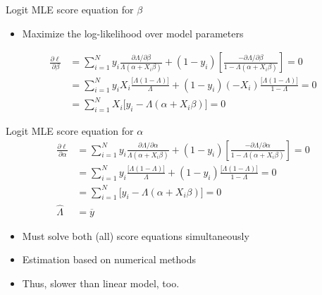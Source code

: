 \documentclass[
  ignorenonframetext,
]{beamer}
\providecommand{\tightlist}{%
  \setlength{\itemsep}{0pt}\setlength{\parskip}{0pt}}
\begin{document}
\begin{frame}{Logit MLE score equation for \(\beta\)}
\protect{}\label{logit-mle-score-equation-for-beta}
\begin{itemize}
\tightlist
\item
  Maximize the log-likelihood over model parameters
\end{itemize}

\[
\begin{split}
\frac{\partial \ell}{\partial \beta} &= \sum_{i=1}^N y_i \frac{\partial
  \Lambda / \partial \beta}{ \Lambda (\alpha + X_i\beta)} + (1-y_i) 
   \left[ \frac{- \partial  \Lambda / \partial \beta}{1-\Lambda(\alpha + X_i\beta)} \right] = 0 \\
&= \sum_{i=1}^N y_i X_i \frac{\big[\Lambda(1-\Lambda)\big]}{\Lambda} 
  + (1-y_i)(-X_i) \frac{\big[\Lambda(1-\Lambda)\big]}{1-\Lambda}  = 0 \\
&= \sum_{i=1}^N X_i \big[y_i - \Lambda(\alpha + X_i \beta) \big] = 0
\end{split}
\]
\end{frame}

\begin{frame}{Logit MLE score equation for \(\alpha\)}
\protect{}\label{logit-mle-score-equation-for-alpha}
\[
\begin{split}
\frac{\partial \ell}{\partial \alpha} &= \sum_{i=1}^N y_i \frac{\partial
  \Lambda / \partial \alpha}{ \Lambda (\alpha + X_i\beta)} + (1-y_i) 
   \left[ \frac{- \partial  \Lambda / \partial \alpha}{1-\Lambda(\alpha + X_i\beta)} \right] = 0 \\
&= \sum_{i=1}^N y_i \frac{\big[\Lambda(1-\Lambda)\big]}{\Lambda} 
  + (1-y_i) \frac{\big[\Lambda(1-\Lambda)\big]}{1-\Lambda}  = 0 \\
&= \sum_{i=1}^N  \big[ y_i - \Lambda(\alpha + X_i \beta) \big] = 0 \\
\hat{\Lambda} &= \overline{y}
\end{split}
\]

\begin{itemize}
\tightlist
\item
  Must solve both (all) score equations simultaneously
\item
  Estimation based on numerical methods
\item
  Thus, slower than linear model, too.
\end{itemize}
\end{frame}
\end{document}
